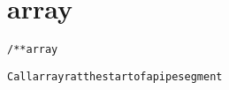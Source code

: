 \section{array}
\begin{shaded}
\begin{alltt}
/** array

  Call arrayr at the start of a pipe segment

\end{alltt}
\end{shaded}
